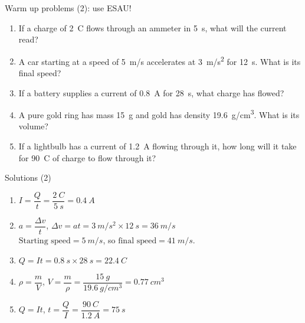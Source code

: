 \documentclass[14pt]{beamer}
\begin{document}
\begin{frame}{Warm up problems (2): use ESAU!}
\begin{enumerate}
\item\label{10.2} If a charge of \SI{2}{C} flows through an ammeter in \SI{5}{s}, what will the current read?
\item\label{3.2} A car starting at a speed of \SI{5}{m/s} accelerates at \SI{3}{m/s^{2}} for \SI{12}{s}.  What is its final speed?
\item\label{10.1} If a battery supplies a current of \SI{0.8}{A} for  \SI{28}{s}, what charge has flowed?
\item\label{4.3} A pure gold ring has mass \SI{15}{g} and gold has density \SI{19.6}{g/cm^{3}}.  What is its volume?
\item\label{10.3} If a lightbulb has a current of \SI{1.2}{A} flowing through it, how long will it take for \SI{90}{C} of charge to flow through it?
\end{enumerate}
\end{frame}

\begin{frame}{Solutions (2)}
\begin{enumerate}
\item $I=\dfrac{Q}{t}=\dfrac{\SI{2}{C}}{\SI{5}{s}}=\SI{0.4}{A}$
\item $a=\dfrac{\Delta v}{t}$, $\Delta v = at = \SI{3}{m/s^{2}}\times\SI{12}{s} = \SI{36}{m/s}$\\
$\text{Starting speed} = \SI{5}{m/s}$, so $\text{final speed}=\SI{41}{m/s}.$
\item $Q=It=\SI{0.8}{s}\times\SI{28}{s}=\SI{22.4}{C}$
\item $\rho=\dfrac{m}{V}$, $V=\dfrac{m}{\rho}=\dfrac{\SI{15}{g}}{\SI{19.6}{g/cm^{3}}}=\SI{0.77}{cm^{3}}$
\item $Q=It$, $t=\dfrac{Q}{I}=\dfrac{\SI{90}{C}}{\SI{1.2}{A}}=\SI{75}{s}$
\end{enumerate}
\end{frame}
\end{document}
